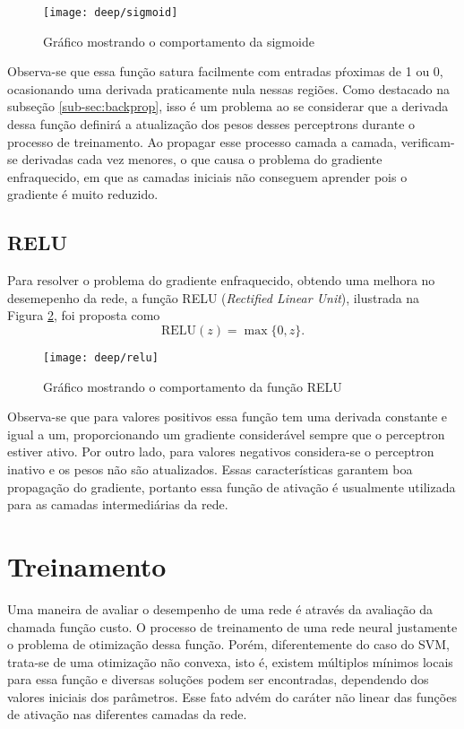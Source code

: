 \begin{figure}
\centering
\texttt{[image: deep/sigmoid]}
\caption{Gráfico mostrando o comportamento da sigmoide}
\label{fig:sigmoid}
\end{figure}

Observa-se que essa função satura facilmente com entradas pŕoximas de 1 ou 0, ocasionando uma derivada praticamente nula nessas regiões. Como destacado na subseção \ref{sub-sec:backprop}, isso é um problema ao se considerar que a derivada dessa função definirá a atualização dos pesos desses perceptrons durante o processo de treinamento. Ao propagar esse processo camada a camada, verificam-se derivadas cada vez menores, o que causa o problema do gradiente enfraquecido, em que as camadas iniciais não conseguem aprender pois o gradiente é muito reduzido.

\subsection{RELU}
Para resolver o problema do gradiente enfraquecido, obtendo uma melhora no desemepenho da rede, a função RELU (\textit{Rectified Linear Unit}), ilustrada na Figura \ref{fig:relu}, foi proposta \cite{nair2010relu} como
\begin{equation}
	\label{eq:relu}
	\text{RELU}(z) = \max\{0,z\}.
\end{equation}

\begin{figure}
\centering
\texttt{[image: deep/relu]}
\caption{Gráfico mostrando o comportamento da função RELU}
\label{fig:relu}
\end{figure}

Observa-se que para valores positivos essa função tem uma derivada constante e igual a um, proporcionando um gradiente considerável sempre que o perceptron estiver ativo. Por outro lado, para valores negativos considera-se o perceptron inativo e os pesos não são atualizados. Essas características garantem boa propagação do gradiente, portanto essa função de ativação é usualmente utilizada para as camadas intermediárias da rede.

\section{Treinamento}
Uma maneira de avaliar o desempenho de uma rede é através da avaliação da chamada função custo. O processo de treinamento de uma rede neural justamente o problema de otimização dessa função. Porém, diferentemente do caso do SVM, trata-se de uma otimização não convexa, isto é, existem múltiplos mínimos locais para essa função e diversas soluções podem ser encontradas, dependendo dos valores iniciais dos parâmetros. Esse fato advém do caráter não linear das funções de ativação nas diferentes camadas da rede.

